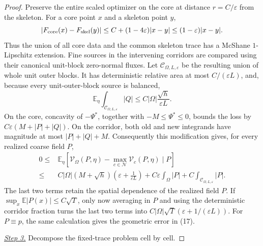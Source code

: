 \documentclass{aomart}
\theoremstyle{definition}
\newcommand{\1}{\mathbf 1}
\begin{document}
\begin{proof}
Preserve the entire scaled optimizer on the core at distance
$r=C/\varepsilon$ from the skeleton. For a core
point $x$ and a skeleton point $y$,
\begin{equation*}
|F_ {\rm core}(x)-F_ {\rm skel}(y)|
\leq C+(1-4\varepsilon)|x-y|\leq(1-\varepsilon)|x-y|.
\end{equation*}
Thus the union of all core data and the common skeleton trace has a
McShane $1$-Lipschitz extension.  Fine sources in the intervening
corridors are compared using their canonical unit-block zero-normal
fluxes.  Let $\mathcal C_ {\Omega,L,\varepsilon}$ be the resulting
union of whole unit outer blocks.  It has deterministic relative area at most
$C/(\varepsilon L)$, and, because every unit-outer-block source is balanced,
\begin{equation}
\mathbb E_ \eta\int_ {\mathcal C_ {\Omega,L,\varepsilon}}|Q|
\leq C|\Omega|\frac{\sqrt h}{\varepsilon L}.
\tag{21a}
\end{equation}
On the core, concavity of $-\Psi^*$, together with
$-M\leq\Psi^*\leq0$, bounds the loss by
$C\varepsilon(M+|P|+|Q|)$.  On the corridor, both old and new
integrands have magnitude at most $|P|+|Q|+M$.  Consequently this modification
gives, for every realized coarse field $P$,
\begin{equation}
\begin{split}
0\leq{}&\mathbb E_ \eta[\mathcal V_ \Omega(P,\eta)
-\max_ {c\in\mathcal N}\mathcal V_ c(P,\eta)\mid P]\\
\leq{}&C|\Omega|(M+\sqrt h)
\left(\varepsilon+\frac1{\varepsilon L}\right)
+C\varepsilon\int_ \Omega|P|
+C\int_ {\mathcal C_ {\Omega,L,\varepsilon}}|P|.          
\end{split}
\tag{21a'}
\end{equation}
The last two terms retain the spatial dependence of the realized field
$P$.  If
$\sup_ x\mathbb E|P(x)|\leq C\sqrt T$, only now averaging in $P$
and using the deterministic corridor fraction turns the last two terms
into $C|\Omega|\sqrt T(\varepsilon+1/(\varepsilon L))$.  For
$P\equiv p$, the same calculation gives the geometric error in (17).

\smallskip\noindent
\underline{\textit{Step 3.}} Decompose the fixed-trace problem cell by cell.


\end{proof}
\end{document}
